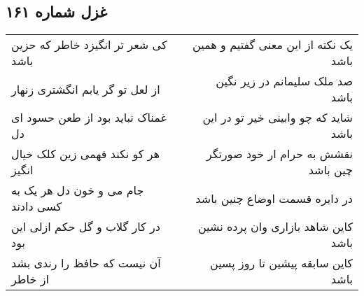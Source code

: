 \begin{center}
\section*{غزل شماره ۱۶۱}
\label{sec:sh161}
\begin{longtable}{l p{0.5cm} r}
کی شعر تر انگیزد خاطر که حزین باشد
&&
یک نکته از این معنی گفتیم و همین باشد
\\
از لعل تو گر یابم انگشتری زنهار
&&
صد ملک سلیمانم در زیر نگین باشد
\\
غمناک نباید بود از طعن حسود ای دل
&&
شاید که چو وابینی خیر تو در این باشد
\\
هر کو نکند فهمی زین کلک خیال انگیز
&&
نقشش به حرام ار خود صورتگر چین باشد
\\
جام می و خون دل هر یک به کسی دادند
&&
در دایره قسمت اوضاع چنین باشد
\\
در کار گلاب و گل حکم ازلی این بود
&&
کاین شاهد بازاری وان پرده نشین باشد
\\
آن نیست که حافظ را رندی بشد از خاطر
&&
کاین سابقه پیشین تا روز پسین باشد
\\
\end{longtable}
\end{center}
